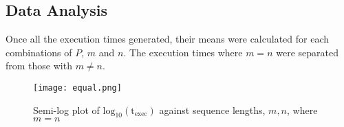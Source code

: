 \documentclass[usletter, 11pt]{extarticle}
\begin{document}
        \subsection{Data Analysis} Once all the execution times generated,
        their means were calculated for each combinations of $P$, $m$ and $n$.
        The execution times where $m = n$ were separated from those with $m \ne
        n$.

        \begin{figure}[ht]
            \begin{center}
                \texttt{[image: equal.png]}
                \caption{Semi-log plot of $\text{log}_{10}(\text{t}_{\text{exec}})$ against sequence lengths, $m,n$, where $m=n$} \label{equal}
            \end{center}
        \end{figure}




    
\end{document}

